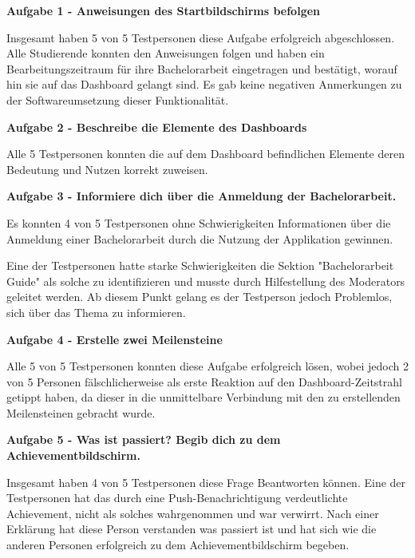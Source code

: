\documentclass[bibliography=totoc,listof=totoc,BCOR=5mm,DIV=12,oneside]{scrbook}
\begin{document}
\par \bigskip \textbf{Aufgabe 1 - Anweisungen des Startbildschirms befolgen}
\par Insgesamt haben 5 von 5 Testpersonen diese Aufgabe erfolgreich abgeschlossen. Alle Studierende konnten den Anweisungen folgen und haben ein Bearbeitungszeitraum für ihre Bachelorarbeit eingetragen und bestätigt, worauf hin sie auf das Dashboard gelangt sind. Es gab keine negativen Anmerkungen zu der Softwareumsetzung dieser Funktionalität.

\par \bigskip \textbf{Aufgabe 2 - Beschreibe die Elemente des Dashboards}
\par Alle 5 Testpersonen konnten die auf dem Dashboard befindlichen Elemente deren Bedeutung und Nutzen korrekt zuweisen.

\par \bigskip \textbf{Aufgabe 3 - Informiere dich über die Anmeldung der Bachelorarbeit.}
\par Es konnten 4 von 5 Testpersonen ohne Schwierigkeiten  Informationen über die Anmeldung einer Bachelorarbeit durch die Nutzung der Applikation gewinnen. 
\par \medskip Eine der Testpersonen hatte starke Schwierigkeiten die Sektion "Bachelorarbeit Guide" als solche zu identifizieren und musste durch Hilfestellung des Moderators geleitet werden. Ab diesem Punkt gelang es der Testperson jedoch Problemlos, sich über das Thema zu informieren.

\par \bigskip \textbf{Aufgabe 4 - Erstelle zwei Meilensteine}
\par Alle 5 von 5 Testpersonen konnten diese Aufgabe erfolgreich lösen, wobei jedoch 2 von 5 Personen fälschlicherweise als erste Reaktion auf den Dashboard-Zeitstrahl getippt haben, da dieser in die unmittelbare Verbindung mit den zu erstellenden Meilensteinen gebracht wurde.

\par \bigskip \textbf{Aufgabe 5 - Was ist passiert? Begib dich zu dem Achievementbildschirm.}
\par Insgesamt haben 4 von 5 Testpersonen diese Frage Beantworten können. Eine der Testpersonen hat das durch eine Push-Benachrichtigung verdeutlichte Achievement, nicht als solches wahrgenommen und war verwirrt. Nach einer Erklärung hat diese Person verstanden was passiert ist und hat sich wie die anderen Personen erfolgreich zu dem Achievementbildschirm begeben.
\end{document}
